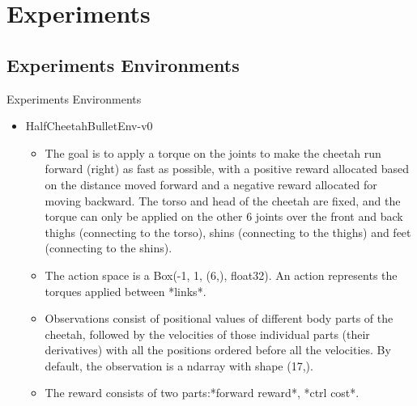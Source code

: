 \documentclass[english, xcolor=dvipsnames, aspectratio=169]{beamer}
\newcommand{\customToC}[2]
{
    \begin{frame}{Overview}
    \tableofcontents[#1,#2]
    \end{frame}
}
\begin{document}

\section{Experiments }

\subsection{Experiments Environments}
\begin{frame}{Experiments Environments}
\begin{itemize}
    \item HalfCheetahBulletEnv-v0
    \begin{itemize}
    \item The goal is to apply a torque
    on the joints to make the cheetah run forward (right) as fast as possible,
    with a positive reward allocated based on the distance moved forward and a
    negative reward allocated for moving backward. The torso and head of the
    cheetah are fixed, and the torque can only be applied on the other 6 joints
    over the front and back thighs (connecting to the torso), shins
    (connecting to the thighs) and feet (connecting to the shins).
        \item  The action space is a Box(-1, 1, (6,), float32). An action represents the torques applied between *links*.
        \item  Observations consist of positional values of different body parts of the
    cheetah, followed by the velocities of those individual parts (their derivatives) with all the positions ordered before all the velocities.
    By default, the observation is a ndarray with shape (17,).
    \item The reward consists of two parts:*forward reward*, *ctrl cost*.
    \end{itemize}
    
\end{itemize}
\end{frame}
\end{document}
